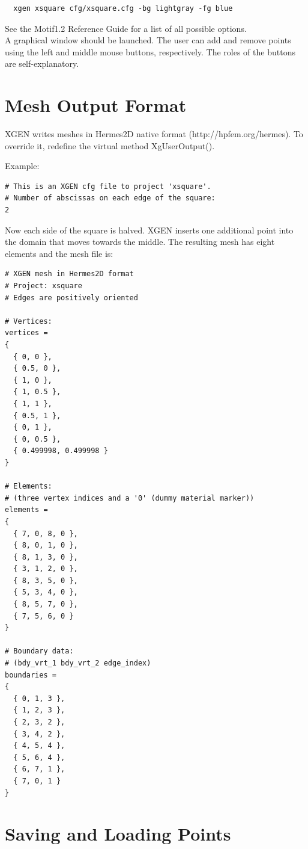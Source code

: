 \documentclass[12pt]{article}
\begin{document}
  \begin{verbatim}  
  xgen xsquare cfg/xsquare.cfg -bg lightgray -fg blue 
  \end{verbatim}
  See the Motif1.2 Reference Guide for a list of all possible options.\\

  \noindent
  A graphical window should be launched. The user can add and remove points using 
  the left and middle mouse buttons, respectively. The roles of 
  the buttons are self-explanatory. 

  \section{Mesh Output Format} \label{out_form}

  XGEN writes meshes in Hermes2D native format (http://hpfem.org/hermes).
  To override it, redefine the virtual method XgUserOutput().

  \newpage
  \noindent
  Example: 

  \begin{verbatim}
# This is an XGEN cfg file to project 'xsquare'.
# Number of abscissas on each edge of the square:
2  
  \end{verbatim}
  Now each side of the square is halved. XGEN inserts one additional point into the domain 
  that moves towards the middle. The resulting mesh has eight elements and the mesh
  file is:
  \begin{verbatim}
# XGEN mesh in Hermes2D format
# Project: xsquare
# Edges are positively oriented

# Vertices:
vertices = 
{
  { 0, 0 },
  { 0.5, 0 },
  { 1, 0 },
  { 1, 0.5 },
  { 1, 1 },
  { 0.5, 1 },
  { 0, 1 },
  { 0, 0.5 },
  { 0.499998, 0.499998 }
}

# Elements:
# (three vertex indices and a '0' (dummy material marker))
elements =
{
  { 7, 0, 8, 0 },
  { 8, 0, 1, 0 },
  { 8, 1, 3, 0 },
  { 3, 1, 2, 0 },
  { 8, 3, 5, 0 },
  { 5, 3, 4, 0 },
  { 8, 5, 7, 0 },
  { 7, 5, 6, 0 }
}

# Boundary data:
# (bdy_vrt_1 bdy_vrt_2 edge_index)
boundaries =
{
  { 0, 1, 3 },
  { 1, 2, 3 },
  { 2, 3, 2 },
  { 3, 4, 2 },
  { 4, 5, 4 },
  { 5, 6, 4 },
  { 6, 7, 1 },
  { 7, 0, 1 }
}
  \end{verbatim}

  \section{Saving and Loading Points}
\end{document}
